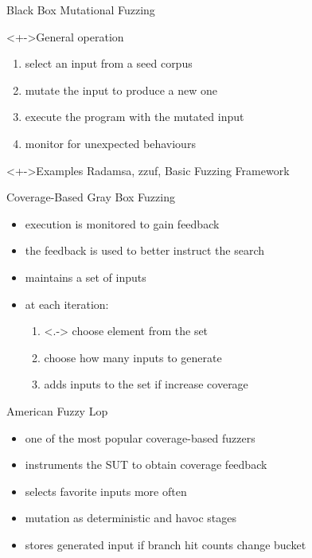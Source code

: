 \documentclass[handout]{beamer}
\begin{document}
\begin{frame}{Black Box Mutational Fuzzing}
    \begin{block}<+->{General operation}
        \begin{enumerate}[<+->]
            \item{} select an input from a seed corpus
            \item{} mutate the input to produce a new one
            \item{} execute the program with the mutated input
            \item{} monitor for unexpected behaviours
        \end{enumerate}
    \end{block}
    \begin{exampleblock}<+->{Examples}
        Radamsa, zzuf, Basic Fuzzing Framework
    \end{exampleblock}
\end{frame}

\begin{frame}{Coverage-Based Gray Box Fuzzing}
    \begin{itemize}[<+->]
        \item{} execution is monitored to gain feedback
        \item{} the feedback is used to better instruct the search
        \item{} maintains a set of inputs
        \item{} at each iteration:
            \begin{enumerate}
                \item<.-> choose element from the set
                \item{} choose how many inputs to generate
                \item{} adds inputs to the set if increase coverage
            \end{enumerate}
    \end{itemize}
\end{frame}

\begin{frame}{American Fuzzy Lop}
    \begin{itemize}[<+->]
        \item{} one of the most popular coverage-based fuzzers
        \item{} instruments the SUT to obtain coverage feedback
        \item{} selects favorite inputs more often
        \item{} mutation as deterministic and havoc stages
        \item{} stores generated input if branch hit counts change bucket
    \end{itemize}
\end{frame}
\end{document}

